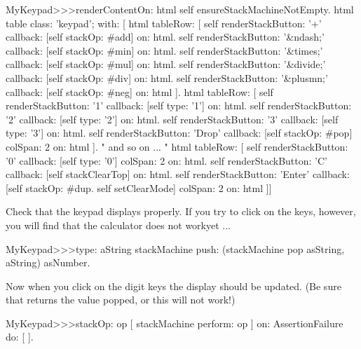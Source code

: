 \documentclass[a4paper,10pt,twoside]{book}
\begin{document}

\begin{code}{}
MyKeypad>>>renderContentOn: html 
  self ensureStackMachineNotEmpty.
  html table
    class: 'keypad';
    with: [
      html tableRow: [
          self renderStackButton: '+' callback: [self stackOp: #add] on: html.
          self renderStackButton: '&ndash;' callback: [self stackOp: #min] on: html.
          self renderStackButton: '&times;' callback: [self stackOp: #mul] on: html.
          self renderStackButton: '&divide;' callback: [self stackOp: #div] on: html.
          self renderStackButton: '&plusmn;' callback: [self stackOp: #neg] on: html ].
        html tableRow: [
          self renderStackButton: '1' callback: [self type: '1'] on: html.
          self renderStackButton: '2' callback: [self type: '2'] on: html.
          self renderStackButton: '3' callback: [self type: '3'] on: html.
          self renderStackButton: 'Drop' callback: [self stackOp: #pop]
          	colSpan: 2 on: html ].
" and so on ... "
        html tableRow: [
          self renderStackButton: '0' callback: [self type: '0'] colSpan: 2 on: html.
          self renderStackButton: 'C' callback: [self stackClearTop] on: html.
          self renderStackButton: 'Enter'
          	callback: [self stackOp: #dup. self setClearMode]
			colSpan: 2 on: html ]]
\end{code}

Check that the keypad displays properly.
If you try to click on the keys, however, you will find that the calculator does not workyet ...

\begin{code}{}
MyKeypad>>>type: aString
	stackMachine push: (stackMachine pop asString, aString) asNumber.
\end{code}
Now when you click on the digit keys the display should be updated.
(Be sure that  returns the value popped, or this will not work!)

\begin{code}{}
MyKeypad>>>stackOp: op
	[ stackMachine perform: op ] on: AssertionFailure do: [ ].
\end{code}
\end{document}
